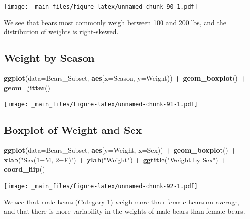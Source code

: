 \documentclass[]{book}
\newenvironment{Shaded}{\begin{snugshade}}{\end{snugshade}}
\newcommand{\KeywordTok}[1]{\textcolor[rgb]{0.13,0.29,0.53}{\textbf{#1}}}
\newcommand{\DataTypeTok}[1]{\textcolor[rgb]{0.13,0.29,0.53}{#1}}
\newcommand{\StringTok}[1]{\textcolor[rgb]{0.31,0.60,0.02}{#1}}
\newcommand{\OperatorTok}[1]{\textcolor[rgb]{0.81,0.36,0.00}{\textbf{#1}}}
\newcommand{\NormalTok}[1]{#1}
\begin{document}
\texttt{[image: \_main\_files/figure-latex/unnamed-chunk-90-1.pdf]}

We see that bears most commonly weigh between 100 and 200 lbs, and the
distribution of weights is right-skewed.

\subsection{Weight by Season}\label{weight-by-season}

\begin{Shaded}
\begin{Highlighting}[]
\KeywordTok{ggplot}\NormalTok{(}\DataTypeTok{data=}\NormalTok{Bears_Subset, }\KeywordTok{aes}\NormalTok{(}\DataTypeTok{x=}\NormalTok{Season, }\DataTypeTok{y=}\NormalTok{Weight)) }\OperatorTok{+}\StringTok{ }\KeywordTok{geom_boxplot}\NormalTok{() }\OperatorTok{+}\StringTok{ }\KeywordTok{geom_jitter}\NormalTok{() }
\end{Highlighting}
\end{Shaded}

\texttt{[image: \_main\_files/figure-latex/unnamed-chunk-91-1.pdf]}

\subsection{Boxplot of Weight and Sex}\label{boxplot-of-weight-and-sex}

\begin{Shaded}
\begin{Highlighting}[]
\KeywordTok{ggplot}\NormalTok{(}\DataTypeTok{data=}\NormalTok{Bears_Subset, }\KeywordTok{aes}\NormalTok{(}\DataTypeTok{y=}\NormalTok{Weight, }\DataTypeTok{x=}\NormalTok{Sex)) }\OperatorTok{+}\StringTok{ }
\StringTok{  }\KeywordTok{geom_boxplot}\NormalTok{() }\OperatorTok{+}\StringTok{ }
\StringTok{  }\KeywordTok{xlab}\NormalTok{(}\StringTok{"Sex(1=M, 2=F)"}\NormalTok{) }\OperatorTok{+}\StringTok{ }\KeywordTok{ylab}\NormalTok{(}\StringTok{"Weight"}\NormalTok{) }\OperatorTok{+}\StringTok{ }\KeywordTok{ggtitle}\NormalTok{(}\StringTok{"Weight by Sex"}\NormalTok{) }\OperatorTok{+}\StringTok{ }\KeywordTok{coord_flip}\NormalTok{()}
\end{Highlighting}
\end{Shaded}

\texttt{[image: \_main\_files/figure-latex/unnamed-chunk-92-1.pdf]}

We see that male bears (Category 1) weigh more than female bears on
average, and that there is more variability in the weights of male bears
than female bears.
\end{document}
